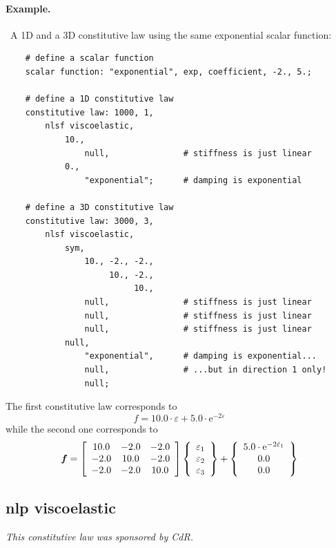 \paragraph{Example.} \
A 1D and a 3D constitutive law using the same exponential scalar function:
\begin{verbatim}
    # define a scalar function
    scalar function: "exponential", exp, coefficient, -2., 5.;

    # define a 1D constitutive law
    constitutive law: 1000, 1,
        nlsf viscoelastic,
            10.,
                null,               # stiffness is just linear
            0.,
                "exponential";      # damping is exponential

    # define a 3D constitutive law
    constitutive law: 3000, 3,
        nlsf viscoelastic,
            sym,
                10., -2., -2.,
                     10., -2.,
                          10.,
                null,               # stiffness is just linear
                null,               # stiffness is just linear
                null,               # stiffness is just linear
            null,
                "exponential",      # damping is exponential...
                null,               # ...but in direction 1 only!
                null;
\end{verbatim}
The first constitutive law corresponds to
\begin{equation}
        f = 10.0 \cdot \varepsilon
        + 5.0 \cdot \mathrm{e}^{-2 \dot{\varepsilon}}
\end{equation}
while the second one corresponds to
\begin{equation}
        \T{f} = \sqbr{\matr{ccc}{
                10.0 & -2.0 & -2.0 \\
                -2.0 & 10.0 & -2.0 \\
                -2.0 & -2.0 & 10.0
        }} \cubr{\cvvect{
                \varepsilon_1 \\
                \varepsilon_2 \\
                \varepsilon_3
        }} + \cubr{\cvvect{
                5.0 \cdot \mathrm{e}^{-2 \dot{\varepsilon}_1} \\
                0.0 \\
                0.0
        }}
\end{equation}



\subsection{nlp viscoelastic}
\emph{This constitutive law was sponsored
by  CdR.}
\bigskip

